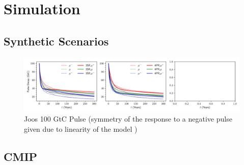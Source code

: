 \documentclass[11pt, a4paper, pdftex, twoside, dvipsnames]{article}
\begin{document}
\section{Simulation}


\subsection{Synthetic Scenarios}

\begin{figure}
    \centering
    \includegraphics[width=\textwidth]{fig/sim_pulse.png}
    \caption{Joos 100 GtC Pulse (symmetry of the response to a negative pulse given due to linearity of the model )}
\end{figure}




\subsection{CMIP}
\end{document}
